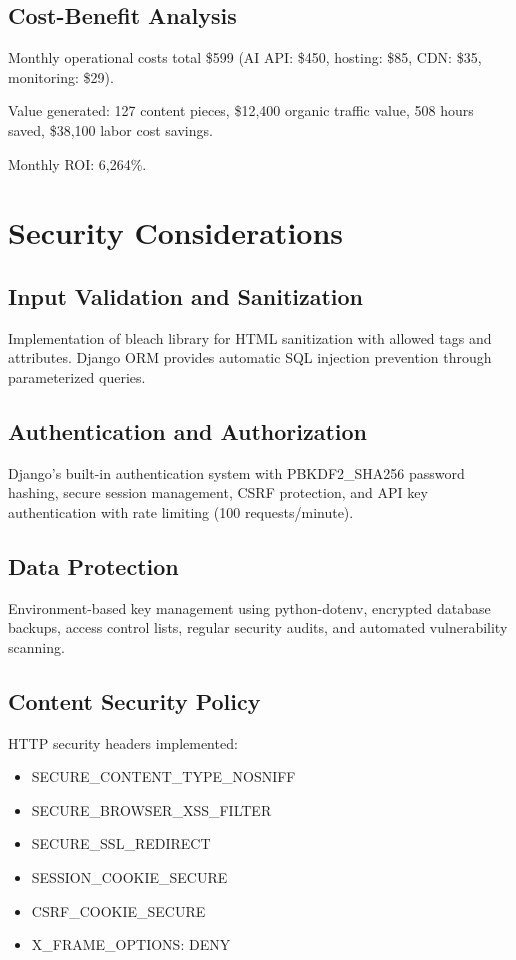 \documentclass[conference]{IEEEtran}
\begin{document}
\subsection{Cost-Benefit Analysis}

Monthly operational costs total \$599 (AI API: \$450, hosting: \$85, CDN: \$35, monitoring: \$29).

Value generated: 127 content pieces, \$12,400 organic traffic value, 508 hours saved, \$38,100 labor cost savings.

Monthly ROI: 6,264\%.

\section{Security Considerations}

\subsection{Input Validation and Sanitization}

Implementation of bleach library for HTML sanitization with allowed tags and attributes. Django ORM provides automatic SQL injection prevention through parameterized queries.

\subsection{Authentication and Authorization}

Django's built-in authentication system with PBKDF2\_SHA256 password hashing, secure session management, CSRF protection, and API key authentication with rate limiting (100 requests/minute).

\subsection{Data Protection}

Environment-based key management using python-dotenv, encrypted database backups, access control lists, regular security audits, and automated vulnerability scanning.

\subsection{Content Security Policy}

HTTP security headers implemented:
\begin{itemize}
    \item SECURE\_CONTENT\_TYPE\_NOSNIFF
    \item SECURE\_BROWSER\_XSS\_FILTER
    \item SECURE\_SSL\_REDIRECT
    \item SESSION\_COOKIE\_SECURE
    \item CSRF\_COOKIE\_SECURE
    \item X\_FRAME\_OPTIONS: DENY
\end{itemize}
\end{document}
